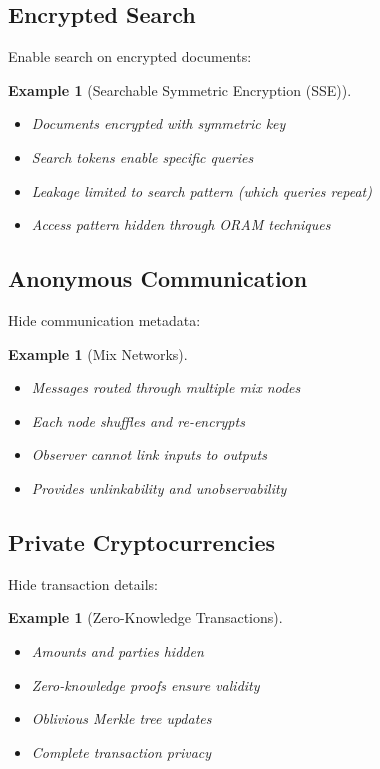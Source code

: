 \documentclass[11pt,final,hidelinks]{article}
\newtheorem{example}[theorem]{Example}
\begin{document}
\subsection{Encrypted Search}

Enable search on encrypted documents:

\begin{example}[Searchable Symmetric Encryption (SSE)]
\begin{itemize}
    \item Documents encrypted with symmetric key
    \item Search tokens enable specific queries
    \item Leakage limited to search pattern (which queries repeat)
    \item Access pattern hidden through ORAM techniques
\end{itemize}
\end{example}

\subsection{Anonymous Communication}

Hide communication metadata:

\begin{example}[Mix Networks]
\begin{itemize}
    \item Messages routed through multiple mix nodes
    \item Each node shuffles and re-encrypts
    \item Observer cannot link inputs to outputs
    \item Provides unlinkability and unobservability
\end{itemize}
\end{example}

\subsection{Private Cryptocurrencies}

Hide transaction details:

\begin{example}[Zero-Knowledge Transactions]
\begin{itemize}
    \item Amounts and parties hidden
    \item Zero-knowledge proofs ensure validity
    \item Oblivious Merkle tree updates
    \item Complete transaction privacy
\end{itemize}
\end{example}
\end{document}
